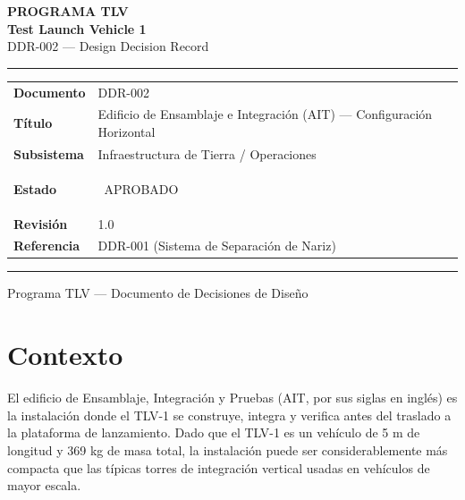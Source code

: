 \documentclass[11pt, a4paper]{article}
\newcommand{\status}[1]{%
  \colorbox{tlvgreen}{\color{white}\small\bfseries\strut\ #1\ }%
}
\begin{document}
\begin{titlepage}
  \centering
  \vspace*{3cm}

  {\large\color{gray}\bfseries PROGRAMA TLV}\\[0.4cm]
  {\Huge\color{tlvblue}\bfseries Test Launch Vehicle 1}\\[0.3cm]
  {\Large\color{tlvmid} DDR-002 — Design Decision Record}\\[2cm]

  \color{tlvrule}\hrule height 0.8pt
  \vspace{0.6cm}

  \begin{tabular}{L{4cm} L{9cm}}
    \textbf{Documento}   & DDR-002 \\
    \textbf{Título}      & Edificio de Ensamblaje e Integración (AIT) — Configuración Horizontal \\
    \textbf{Subsistema}  & Infraestructura de Tierra / Operaciones \\
    \textbf{Estado}      & \status{APROBADO} \\
    \textbf{Revisión}    & 1.0 \\
    \textbf{Referencia}  & DDR-001 (Sistema de Separación de Nariz) \\
  \end{tabular}

  \vspace{0.6cm}
  \color{tlvrule}\hrule height 0.8pt

  \vfill
  {\small\color{gray} Programa TLV — Documento de Decisiones de Diseño}
\end{titlepage}

\section{Contexto}

El edificio de Ensamblaje, Integración y Pruebas (AIT, por sus siglas en inglés) es la instalación donde el TLV-1 se construye, integra y verifica antes del traslado a la plataforma de lanzamiento. Dado que el TLV-1 es un vehículo de 5 m de longitud y 369 kg de masa total, la instalación puede ser considerablemente más compacta que las típicas torres de integración vertical usadas en vehículos de mayor escala.
\end{document}
